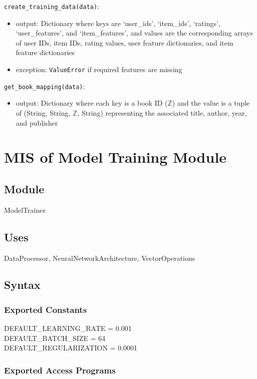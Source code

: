 \documentclass[12pt, titlepage]{article}
\begin{document}
\noindent \texttt{create\_training\_data(data)}:
\begin{itemize}
\item output: Dictionary where keys are `user\_ids', `item\_ids', `ratings', `user\_features', and `item\_features', and values are the corresponding arrays of user IDs, item IDs, rating values, user feature dictionaries, and item feature dictionaries
\item exception: \texttt{ValueError} if required features are missing
\end{itemize}

\noindent \texttt{get\_book\_mapping(data)}:
\begin{itemize}
\item output: Dictionary where each key is a book ID ($\mathbb{Z}$) and the value is a tuple of (String, String, $\mathbb{Z}$, String) representing the associated title, author, year, and publisher
\end{itemize}

\newpage

\section{MIS of Model Training Module} \label{ModuleMT}

\subsection{Module}

ModelTrainer

\subsection{Uses}
DataProcessor, NeuralNetworkArchitecture, VectorOperations

\subsection{Syntax}

\subsubsection{Exported Constants}
DEFAULT\_LEARNING\_RATE = 0.001\\
DEFAULT\_BATCH\_SIZE = 64\\
DEFAULT\_REGULARIZATION = 0.0001
\subsubsection{Exported Access Programs}
\end{document}
